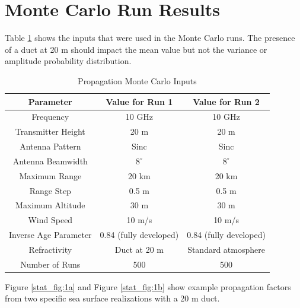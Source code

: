 \section{Monte Carlo Run Results}
Table \ref{stat_tab:0} shows the inputs that were used in the Monte Carlo runs. The presence of a duct at 20 m should impact the mean value but not the variance or amplitude probability distribution.
\begin{table}[H]
  \begin{center}
      \renewcommand{\baselinestretch}{1} \small\normalsize
  \begin{quote}
    \caption[Propagation Monte Carlo Inputs]{Propagation Monte Carlo Inputs\label{stat_tab:0}}
  \end{quote}
  \begin{tabular} {|c | c | c|}
    \hline
  \bf{Parameter} & \bf{Value for Run 1} & \bf{Value for Run 2}\\ \hline
  Frequency & 10 GHz  & 10 GHz\\ \hline
  Transmitter Height & 20 m & 20 m   \\ \hline
  Antenna Pattern & Sinc  & Sinc \\ \hline
  Antenna Beamwidth & $8^{\circ}$ & $8^{\circ}$  \\ \hline
  Maximum Range & 20 km & 20 km  \\ \hline
  Range Step & 0.5 m  & 0.5 m \\ \hline
  Maximum Altitude & 30 m  & 30 m\\ \hline
  Wind Speed & 10 m/s & 10 m/s \\ \hline
  Inverse Age Parameter & 0.84 (fully developed) & 0.84 (fully developed) \\ \hline
  Refractivity & Duct at 20 m  & Standard atmosphere\\ \hline
  Number of Runs & 500  & 500\\ \hline
\end{tabular}
\end{center}
\end{table}
\renewcommand{\baselinestretch}{2} \small\normalsize


Figure \ref{stat_fig:1a} and Figure \ref{stat_fig:1b} show example propagation factors from two specific sea surface realizations with a 20 m duct.

